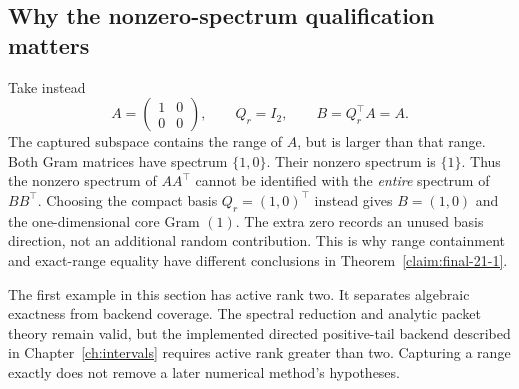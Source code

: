 \subsection*{Why the nonzero-spectrum qualification matters}
Take instead
\[
A=\begin{pmatrix}1&0\\0&0\end{pmatrix},\qquad Q_r=I_2,\qquad B=Q_r^\top A=A.
\]
The captured subspace contains the range of $A$, but is larger than that range.
Both Gram matrices have spectrum $\{1,0\}$. Their nonzero spectrum is
$\{1\}$. Thus the nonzero spectrum of $AA^\top$ cannot be identified with the
\emph{entire} spectrum of $BB^\top$. Choosing the compact basis
$Q_r=(1,0)^\top$ instead gives $B=(1,0)$ and the one-dimensional core Gram
$(1)$. The extra zero records an unused basis direction, not an additional
random contribution. This is why range containment and exact-range equality
have different conclusions in Theorem~\ref{claim:final-21-1}.

The first example in this section has active rank two. It separates algebraic
exactness from backend coverage. The spectral reduction and analytic packet theory remain
valid, but the implemented directed positive-tail backend described in
Chapter~\ref{ch:intervals} requires active rank greater than two. Capturing a
range exactly does not remove a later numerical method's hypotheses.
